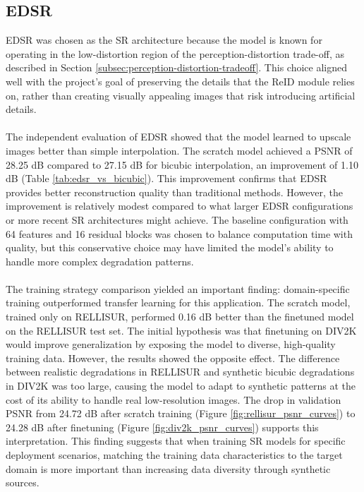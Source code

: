 \subsection{EDSR}
\acs{EDSR} was chosen as the \acs{SR} architecture because the model is known for operating in the low-distortion region of the perception-distortion trade-off, as described in Section \ref{subsec:perception-distortion-tradeoff}. This choice aligned well with the project's goal of preserving the details that the \acs{ReID} module relies on, rather than creating visually appealing images that risk introducing artificial details.
\\\\
The independent evaluation of \acs{EDSR} showed that the model learned to upscale images better than simple interpolation. The scratch model achieved a \acs{PSNR} of 28.25 dB compared to 27.15 dB for bicubic interpolation, an improvement of 1.10 dB (Table \ref{tab:edsr_vs_bicubic}). This improvement confirms that \acs{EDSR} provides better reconstruction quality than traditional methods. However, the improvement is relatively modest compared to what larger \acs{EDSR} configurations or more recent \acs{SR} architectures might achieve. The baseline configuration with 64 features and 16 residual blocks was chosen to balance computation time with quality, but this conservative choice may have limited the model's ability to handle more complex degradation patterns.
\\\\
The training strategy comparison yielded an important finding: domain-specific training outperformed transfer learning for this application. The scratch model, trained only on \acs{RELLISUR}, performed 0.16 dB better than the finetuned model on the \acs{RELLISUR} test set. The initial hypothesis was that finetuning on \acs{DIV2K} would improve generalization by exposing the model to diverse, high-quality training data. However, the results showed the opposite effect. The difference between realistic degradations in \acs{RELLISUR} and synthetic bicubic degradations in \acs{DIV2K} was too large, causing the model to adapt to synthetic patterns at the cost of its ability to handle real low-resolution images. The drop in validation \acs{PSNR} from 24.72 dB after scratch training (Figure \ref{fig:rellisur_psnr_curves}) to 24.28 dB after finetuning (Figure \ref{fig:div2k_psnr_curves}) supports this interpretation. This finding suggests that when training \acs{SR} models for specific deployment scenarios, matching the training data characteristics to the target domain is more important than increasing data diversity through synthetic sources.

